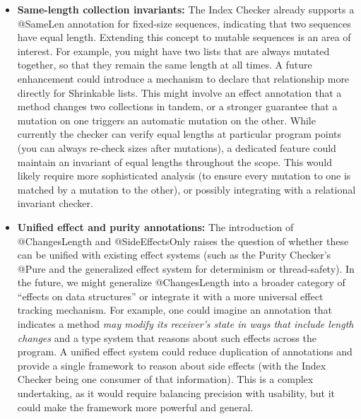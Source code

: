\begin{itemize}
\item
  \textbf{Same-length collection invariants:}
    The Index Checker already supports a @SameLen annotation for fixed-size sequences, indicating
    that two sequences have equal length. Extending this concept to mutable sequences is an area of
    interest. For example, you might have two lists that are always mutated together, so that they
    remain the same length at all times. A future enhancement could introduce a mechanism to declare
    that relationship more directly for Shrinkable lists. This might involve an effect annotation
    that a method changes two collections in tandem, or a stronger guarantee that a mutation on one
    triggers an automatic mutation on the other. While currently the checker can verify equal lengths at
    particular program points (you can always re-check sizes after mutations), a dedicated feature could
    maintain an invariant of equal lengths throughout the scope. This would likely require more
    sophisticated analysis (to ensure every mutation to one is matched by a mutation to the other),
    or possibly integrating with a relational invariant checker.

\item
  \textbf{Unified effect and purity annotations:}
    The introduction of @ChangesLength and @SideEffectsOnly raises the question of whether these can
    be unified with existing effect systems (such as the Purity Checker’s @Pure and the generalized
    effect system for determinism or thread-safety). In the future, we might generalize @ChangesLength
    into a broader category of “effects on data structures” or integrate it with a more universal effect
    tracking mechanism. For example, one could imagine an annotation that indicates a method
    \emph{may modify its receiver’s state in ways that include length changes} and a type system that
    reasons about such effects across the program. A unified effect system could reduce duplication of
    annotations and provide a single framework to reason about side effects (with the Index Checker being
    one consumer of that information). This is a complex undertaking, as it would require balancing precision
    with usability, but it could make the framework more powerful and general.


\end{itemize}
